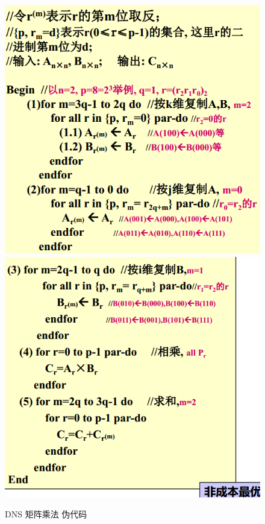 \documentclass[UTF8,a4paper]{ctexart}
\begin{document}
\begin{figure}[H]
  \centering
  \includegraphics[scale = 0.3]{assets/ParallelComputing_8c711.png}
  \includegraphics[scale = 0.3]{assets/ParallelComputing_23b58.png}
  \caption{DNS 矩阵乘法 伪代码}
\end{figure}
\end{document}
